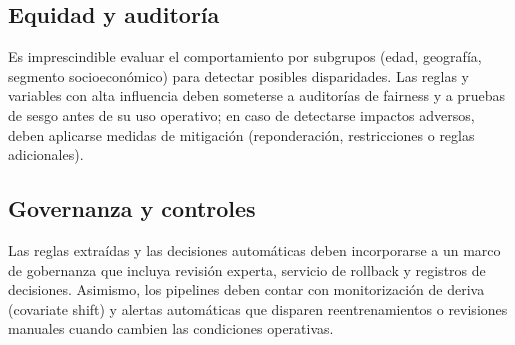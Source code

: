 \documentclass[12pt,a4paper]{article}
\begin{document}
\subsection{Equidad y auditor\'ia}
Es imprescindible evaluar el comportamiento por subgrupos (edad, geograf\'ia, segmento socioecon\'omico) para detectar posibles disparidades. Las reglas y variables con alta influencia deben someterse a auditor\'ias de fairness y a pruebas de sesgo antes de su uso operativo; en caso de detectarse impactos adversos, deben aplicarse medidas de mitigaci\'on (reponderaci\'on, restricciones o reglas adicionales).

\subsection{Governanza y controles}
Las reglas extra\'idas y las decisiones autom\'aticas deben incorporarse a un marco de gobernanza que incluya revisi\'on experta, servicio de rollback y registros de decisiones. Asimismo, los pipelines deben contar con monitorizaci\'on de deriva (covariate shift) y alertas autom\'aticas que disparen reentrenamientos o revisiones manuales cuando cambien las condiciones operativas.
\end{document}
